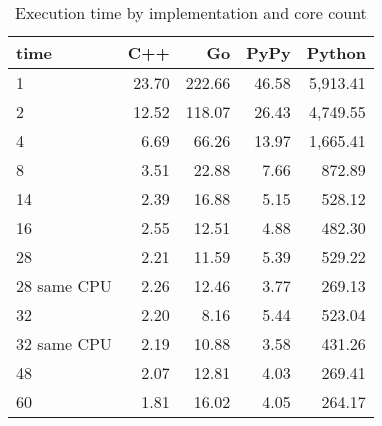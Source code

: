 \begin{table}[ht]
    \centering
    \begin{tabular}{lrrrr}
        \hline
        time            & C++     & Go      & PyPy     & Python     \\
        \hline
        1               & 23.70   & 222.66  & 46.58    & 5,913.41   \\
        2               & 12.52   & 118.07  & 26.43    & 4,749.55   \\
        4               & 6.69    & 66.26   & 13.97    & 1,665.41   \\
        8	              & 3.51  	& 22.88 	& 7.66     & 872.89     \\
        14              & 2.39    & 16.88   & 5.15     & 528.12     \\
        16              & 2.55    & 12.51   & 4.88     & 482.30     \\
        28              & 2.21    & 11.59   & 5.39     & 529.22     \\
        28 same CPU     & 2.26    & 12.46   & 3.77     & 269.13     \\
        32              & 2.20    & 8.16    & 5.44     & 523.04     \\
        32 same CPU     & 2.19    & 10.88   & 3.58     & 431.26     \\
        48              & 2.07    & 12.81   & 4.03     & 269.41     \\
        60              & 1.81    & 16.02   & 4.05     & 264.17     \\
        \hline
    \end{tabular}
    \caption{Execution time by implementation and core count}
    \label{tab:server-execution-time}
\end{table}

